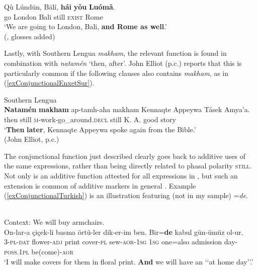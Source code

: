 {\begin{exe}
\begin{xlist}
	\ex\label{exConjunctionalMandarin2}
	\gll Qù Lúndūn, Bālí, \textbf{hái} \textbf{yǒu} \textbf{Luómǎ}.\\
	go London Bali still \textsc{exist} Rome\\
	\glt \lq We are going to London, Bali, \textbf{and Rome as well}.\rq
	\\(\cite[312]{Wiedenhof2015}, glosses added)
	\end{xlist}
\end{exe}

Lastly, with Southern Lengua \textit{makham}, the relevant function is found in combination with \textit{natamén} \lq then, after\rq{}. John Elliot (p.c.) reports that this is particularly common if the following clauses also contains \textit{makham}, as in (\ref{exConjunctionalEnxetSur}).

\begin{exe}
	\ex Southern Lengua\label{exConjunctionalEnxetSur}\\
	\gll \textbf{Natamén} \textbf{makham} ap-tamh-aha makham Kennaqte Appeywa Tásek Amya’a.\\
	then still \textsc{m}-work-go\_around.\textsc{decl} still K. A. good story\\
	\glt \lq \textbf{Then} \textbf{later}, Kennaqte Appeywa spoke again from the Bible.' \\(John Elliot, p.c.)
\end{exe}

 The conjunctional function just described clearly goes back to additive uses of the same expressions, rather than being directly related to phasal polarity \textsc{still}. Not only is an additive function attested for all expressions in , but such an extension is common of additive markers in general \parencite{Forker2016}. Example (\ref{exConjunctionalTurkish}) is an illustration featuring  (not in my sample) \mbox{=\textit{de}}.

\begin{exe}
	\ex {}\label{exConjunctionalTurkish}\\
	Context: We will buy armchairs.\\
	\gll On-lar-a çiçek-li basma örtü-ler dik-er-im ben. Bir=\textbf{de} kabul gün-ümüz ol-ur.\\
	3-\textsc{pl}-\textsc{dat} flower-\textsc{adj} print cover-\textsc{pl} sew-\textsc{aor}-1\textsc{sg} 1\textsc{sg} one=also admission day-\textsc{poss}.1\textsc{pl} be(come)-\textsc{aor}\\
	\glt \lq I will make covers for them in floral print. \textbf{And} we will have an \lq\lq{}at home day{\rq\rq}.\rq{ }\parencite{Kerslake1996}
\end{exe}

}
